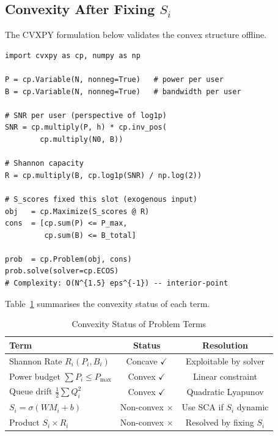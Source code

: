 \documentclass[conference]{IEEEtran}
\begin{document}
\subsection{Convexity After Fixing $S_i$}

The CVXPY formulation below validates the convex structure offline.

\begin{lstlisting}[style=pythonstyle, caption={CVXPY DCP Formulation (offline validation)}, label={lst:cvxpy}]
import cvxpy as cp, numpy as np

P = cp.Variable(N, nonneg=True)   # power per user
B = cp.Variable(N, nonneg=True)   # bandwidth per user

# SNR per user (perspective of log1p)
SNR = cp.multiply(P, h) * cp.inv_pos(
        cp.multiply(N0, B))

# Shannon capacity
R = cp.multiply(B, cp.log1p(SNR) / np.log(2))

# S_scores fixed this slot (exogenous input)
obj   = cp.Maximize(S_scores @ R)
cons  = [cp.sum(P) <= P_max,
         cp.sum(B) <= B_total]

prob  = cp.Problem(obj, cons)
prob.solve(solver=cp.ECOS)
# Complexity: O(N^{1.5} eps^{-1}) -- interior-point
\end{lstlisting}

Table~\ref{tab:convexity} summarises the convexity status of each term.

\begin{table}[!t]
\renewcommand{\arraystretch}{1.2}
\caption{Convexity Status of Problem Terms}
\label{tab:convexity}
\centering
\begin{tabular}{@{}lcc@{}}
\toprule
\textbf{Term} & \textbf{Status} & \textbf{Resolution} \\
\midrule
Shannon Rate $R_i(P_i,B_i)$        & Concave $\checkmark$  & Exploitable by solver \\
Power budget $\sum P_i \le P_{\max}$ & Convex $\checkmark$   & Linear constraint \\
Queue drift $\frac{1}{2}\sum Q_i^2$ & Convex $\checkmark$   & Quadratic Lyapunov \\
$S_i = \sigma(W M_i + b)$           & Non-convex $\times$ & Use SCA if $S_i$ dynamic \\
Product $S_i \times R_i$            & Non-convex $\times$ & Resolved by fixing $S_i$ \\
\bottomrule
\end{tabular}
\end{table}
\end{document}
